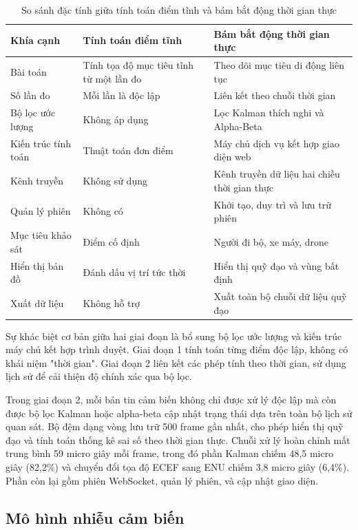 \begin{table}[H]
\centering
\caption{So sánh đặc tính giữa tính toán điểm tĩnh và bám bắt động thời gian thực}
\label{tab:phase-comparison}
\begin{tabularx}{\linewidth}{lXX}
\toprule
\textbf{Khía cạnh} & \textbf{Tính toán điểm tĩnh} & \textbf{Bám bắt động thời gian thực} \\
\midrule
Bài toán & Tính tọa độ mục tiêu tĩnh từ một lần đo & Theo dõi mục tiêu di động liên tục \\
Số lần đo & Mỗi lần là độc lập & Liên kết theo chuỗi thời gian \\
Bộ lọc ước lượng & Không áp dụng & Lọc Kalman thích nghi và Alpha-Beta \\
Kiến trúc tính toán & Thuật toán đơn điểm & Máy chủ dịch vụ kết hợp giao diện web \\
Kênh truyền & Không sử dụng & Kênh truyền dữ liệu hai chiều thời gian thực \\
Quản lý phiên & Không có & Khởi tạo, duy trì và lưu trữ phiên \\
Mục tiêu khảo sát & Điểm cố định & Người đi bộ, xe máy, drone \\
Hiển thị bản đồ & Đánh dấu vị trí tức thời & Hiển thị quỹ đạo và vùng bất định \\
Xuất dữ liệu & Không hỗ trợ & Xuất toàn bộ chuỗi dữ liệu quỹ đạo \\
\bottomrule
\end{tabularx}
\end{table}

Sự khác biệt cơ bản giữa hai giai đoạn là bổ sung bộ lọc ước lượng và kiến trúc máy chủ kết hợp trình duyệt. Giai đoạn 1 tính toán từng điểm độc lập, không có khái niệm "thời gian". Giai đoạn 2 liên kết các phép tính theo thời gian, sử dụng lịch sử để cải thiện độ chính xác qua bộ lọc.

Trong giai đoạn 2, mỗi bản tin cảm biến không chỉ được xử lý độc lập mà còn được bộ lọc Kalman hoặc alpha-beta cập nhật trạng thái dựa trên toàn bộ lịch sử quan sát. Bộ đệm dạng vòng lưu trữ 500 frame gần nhất, cho phép hiển thị quỹ đạo và tính toán thống kê sai số theo thời gian thực. Chuỗi xử lý hoàn chỉnh mất trung bình 59 micro giây mỗi frame, trong đó phần Kalman chiếm 48,5 micro giây (82,2\%) và chuyển đổi tọa độ ECEF sang ENU chiếm 3,8 micro giây (6,4\%). Phần còn lại gồm phiên WebSocket, quản lý phiên, và cập nhật giao diện.

\subsection{Mô hình nhiễu cảm biến}

